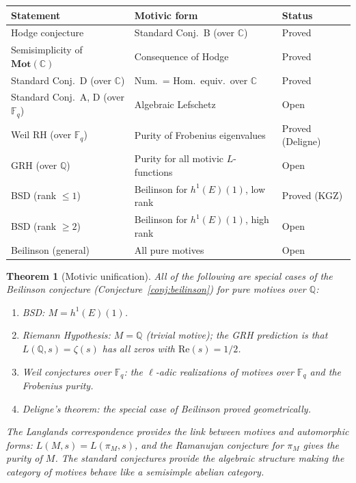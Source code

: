 \documentclass[12pt]{article}
\newtheorem{theorem}{Theorem}
\theoremstyle{definition}
\theoremstyle{remark}
\begin{document}
\begin{center}
\begin{tabular}{@{}lll@{}}
\toprule
Statement & Motivic form & Status \\
\midrule
Hodge conjecture & Standard Conj.\ B (over $\mathbb{C}$) & Proved \cite{hodge2} \\
Semisimplicity of $\mathbf{Mot}(\mathbb{C})$ & Consequence of Hodge & Proved \\
Standard Conj.\ D (over $\mathbb{C}$) & Num.\ = Hom.\ equiv.\ over $\mathbb{C}$ & Proved \\
Standard Conj.\ A, D (over $\mathbb{F}_q$) & Algebraic Lefschetz & Open \\
Weil RH (over $\mathbb{F}_q$) & Purity of Frobenius eigenvalues & Proved (Deligne) \\
GRH (over $\mathbb{Q}$) & Purity for all motivic $L$-functions & Open \\
BSD (rank $\leq 1$) & Beilinson for $h^1(E)(1)$, low rank & Proved (KGZ) \\
BSD (rank $\geq 2$) & Beilinson for $h^1(E)(1)$, high rank & Open \\
Beilinson (general) & All pure motives & Open \\
\bottomrule
\end{tabular}
\end{center}

\begin{theorem}[Motivic unification]\label{thm:unify}
All of the following are special cases of the Beilinson conjecture
(Conjecture~\ref{conj:beilinson}) for pure motives over $\mathbb{Q}$:
\begin{enumerate}
\item BSD: $M = h^1(E)(1)$.
\item Riemann Hypothesis: $M = \mathbb{Q}$ (trivial motive);
  the GRH prediction is that $L(\mathbb{Q},s) = \zeta(s)$ has all zeros
  with $\mathrm{Re}(s) = 1/2$.
\item Weil conjectures over $\mathbb{F}_q$: the $\ell$-adic realizations of
  motives over $\mathbb{F}_q$ and the Frobenius purity.
\item Deligne's theorem: the special case of Beilinson proved geometrically.
\end{enumerate}
The Langlands correspondence provides the link between motives and automorphic
forms: $L(M,s) = L(\pi_M,s)$, and the Ramanujan conjecture for $\pi_M$ gives
the purity of $M$. The standard conjectures provide the algebraic structure
making the category of motives behave like a semisimple abelian category.
\end{theorem}
\end{document}
